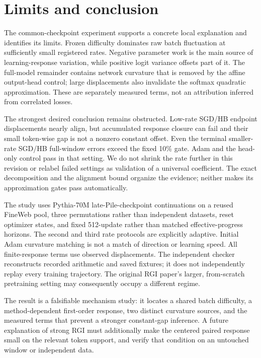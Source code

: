 \section{Limits and conclusion}

The common-checkpoint experiment supports a concrete local explanation and identifies its limits.  Frozen difficulty dominates raw batch fluctuation at sufficiently small registered rates.  Negative parameter work is the main source of learning-response variation, while positive logit variance offsets part of it.  The full-model remainder contains network curvature that is removed by the affine output-head control; large displacements also invalidate the softmax quadratic approximation.  These are separately measured terms, not an attribution inferred from correlated losses.

The strongest desired conclusion remains obstructed.  Low-rate SGD/HB endpoint displacements nearly align, but accumulated response closure can fail and their small token-wise gap is not a nonzero constant offset.  Even the terminal smaller-rate SGD/HB full-window errors exceed the fixed 10\% gate.  Adam and the head-only control pass in that setting.  We do not shrink the rate further in this revision or relabel failed settings as validation of a universal coefficient.  The exact decomposition and the alignment bound organize the evidence; neither makes its approximation gates pass automatically.

The study uses Pythia-70M late-Pile-checkpoint continuations on a reused FineWeb pool, three permutations rather than independent datasets, reset optimizer states, and fixed 512-update rather than matched effective-progress horizons.  The second and third rate protocols are explicitly adaptive.  Initial Adam curvature matching is not a match of direction or learning speed.  All finite-response terms use observed displacements.  The independent checker reconstructs recorded arithmetic and saved fixtures; it does not independently replay every training trajectory.  The original RGI paper's larger, from-scratch pretraining setting may consequently occupy a different regime.

The result is a falsifiable mechanism study: it locates a shared batch difficulty, a method-dependent first-order response, two distinct curvature sources, and the measured terms that prevent a stronger constant-gap inference.  A future explanation of strong RGI must additionally make the centered paired response small on the relevant token support, and verify that condition on an untouched window or independent data.
